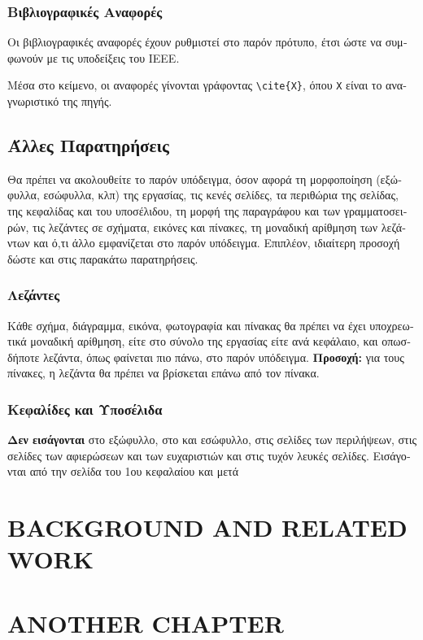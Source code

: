\documentclass[inscr,ack,preface]{dithesis}
\begin{document}
\begin{greek}
    \subsection{Βιβλιογραφικές Αναφορές}
    Οι βιβλιογραφικές αναφορές έχουν ρυθμιστεί στο παρόν πρότυπο, έτσι ώστε να συμφωνούν με τις υποδείξεις του IEEE.

    Μέσα στο κείμενο, οι αναφορές γίνονται γράφοντας \verb!\cite{X}!, όπου \texttt{X} είναι το αναγνωριστικό της πηγής.

    \section{Άλλες Παρατηρήσεις}
    Θα πρέπει να ακολουθείτε το παρόν υπόδειγμα, όσον αφορά τη μορφοποίηση (εξώφυλλα, εσώφυλλα, κλπ) της εργασίας, τις κενές σελίδες, τα περιθώρια της σελίδας, της κεφαλίδας και του υποσέλιδου, τη μορφή της παραγράφου και των γραμματοσειρών, τις λεζάντες σε σχήματα, εικόνες και πίνακες, τη μοναδική αρίθμηση των λεζάντων και ό,τι άλλο εμφανίζεται στο παρόν υπόδειγμα. Επιπλέον, ιδιαίτερη προσοχή δώστε και στις παρακάτω παρατηρήσεις.

    \subsection{Λεζάντες}
    Κάθε σχήμα, διάγραμμα, εικόνα, φωτογραφία και πίνακας θα πρέπει να έχει υποχρεωτικά μοναδική αρίθμηση, είτε στο σύνολο της εργασίας είτε ανά κεφάλαιο, και οπωσδήποτε λεζάντα, όπως φαίνεται πιο πάνω, στο παρόν υπόδειγμα. \textbf{Προσοχή:} για τους πίνακες, η λεζάντα θα πρέπει να βρίσκεται επάνω από τον πίνακα.

    \subsection{Κεφαλίδες και Υποσέλιδα}
    \textbf{Δεν εισάγονται} στο εξώφυλλο, στο  και  εσώφυλλο, στις σελίδες των περιλήψεων, στις σελίδες των αφιερώσεων και των ευχαριστιών και στις τυχόν λευκές σελίδες. Εισάγονται από την  σελίδα του 1ου κεφαλαίου και μετά

  \end{greek}


\chapter{BACKGROUND AND RELATED WORK}
  \lipsum[4-7]

\chapter{ANOTHER CHAPTER}
  \lipsum[10-20]
\end{document}
